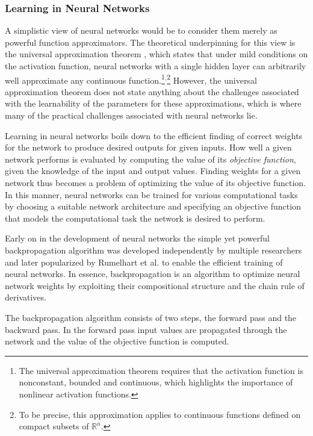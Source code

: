 \subsubsection{Learning in Neural Networks}

A simplistic view of neural networks would be to consider them merely as powerful function approximators. The theoretical underpinning for this view is the universal approximation theorem \cite{universal_approximation_theorem}, which states that under mild conditions on the activation function, neural networks with a single hidden layer can arbitrarily well approximate any continuous function.\footnote{The universal approximation theorem requires that the activation function is nonconstant, bounded and continuous, which highlights the importance of nonlinear activation functions.}$^{,}$\footnote{To be precise, this approximation applies to continuous functions defined on compact subsets of $\mathbb{R}^n$.} However, the universal approximation theorem does not state anything about the challenges associated with the learnability of the parameters for these approximations, which is where many of the practical challenges associated with neural networks lie.

Learning in neural networks boils down to the efficient finding of correct weights for the network to produce desired outputs for given inputs. How well a given network performs is evaluated by computing the value of its \textit{objective function}, given the knowledge of the input and output values. Finding weights for a given network thus becomes a problem of optimizing the value of its objective function. In this manner, neural networks can be trained for various computational tasks by choosing a suitable network architecture and specifying an objective function that models the computational task the network is desired to perform.

Early on in the development of neural networks the simple yet powerful backpropagation algorithm was developed independently by multiple researchers and later popularized by Rumelhart et al. \cite{nature_backprop} to enable the efficient training of neural networks. In essence, backpropagation is an algorithm to optimize neural network weights by exploiting their compositional structure and the chain rule of derivatives.

The backpropagation algorithm consists of two steps, the forward pass and the backward pass. In the forward pass input values are propagated through the network and the value of the objective function is computed. 

